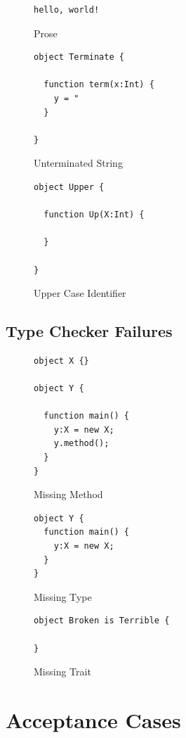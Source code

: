 \documentclass[11pt,a4paper]{report}
\begin{document}
\begin{figure}[H]
\begin{verbatim}
hello, world!
\end{verbatim}
\caption{Prose}
\end{figure}

\begin{figure}[H]
\begin{verbatim}
object Terminate {

  function term(x:Int) {
    y = "
  }

}
\end{verbatim}
\caption{Unterminated String}
\end{figure}

\begin{figure}[H]
\begin{verbatim}
object Upper {

  function Up(X:Int) {

  }

}
\end{verbatim}
\caption{Upper Case Identifier}
\end{figure}

\subsection{Type Checker Failures}
\begin{figure}[H]
\begin{verbatim}
object X {}

object Y {

  function main() {
    y:X = new X;
    y.method();
  }
}
\end{verbatim}
\caption{Missing Method}
\end{figure}

\begin{figure}[H]
\begin{verbatim}
object Y {
  function main() {
    y:X = new X;
  }
}
\end{verbatim}
\caption{Missing Type}
\end{figure}

\begin{figure}[H]
\begin{verbatim}
object Broken is Terrible {

}
\end{verbatim}
\caption{Missing Trait}
\end{figure}

\section{Acceptance Cases}
\end{document}
